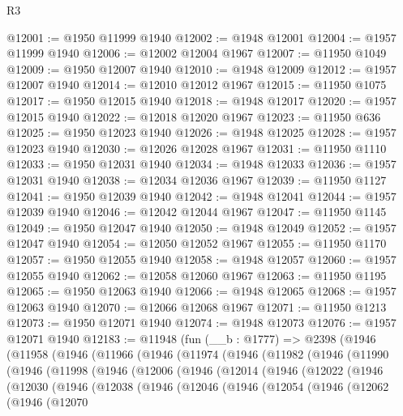 \begin{lexlean}{R3}
\begin{coremodule}
@12001 := @1950 @11999 @1940
@12002 := @1948 @12001
@12004 := @1957 @11999 @1940
@12006 := @12002 @12004 @1967
@12007 := @11950 @1049
@12009 := @1950 @12007 @1940
@12010 := @1948 @12009
@12012 := @1957 @12007 @1940
@12014 := @12010 @12012 @1967
@12015 := @11950 @1075
@12017 := @1950 @12015 @1940
@12018 := @1948 @12017
@12020 := @1957 @12015 @1940
@12022 := @12018 @12020 @1967
@12023 := @11950 @636
@12025 := @1950 @12023 @1940
@12026 := @1948 @12025
@12028 := @1957 @12023 @1940
@12030 := @12026 @12028 @1967
@12031 := @11950 @1110
@12033 := @1950 @12031 @1940
@12034 := @1948 @12033
@12036 := @1957 @12031 @1940
@12038 := @12034 @12036 @1967
@12039 := @11950 @1127
@12041 := @1950 @12039 @1940
@12042 := @1948 @12041
@12044 := @1957 @12039 @1940
@12046 := @12042 @12044 @1967
@12047 := @11950 @1145
@12049 := @1950 @12047 @1940
@12050 := @1948 @12049
@12052 := @1957 @12047 @1940
@12054 := @12050 @12052 @1967
@12055 := @11950 @1170
@12057 := @1950 @12055 @1940
@12058 := @1948 @12057
@12060 := @1957 @12055 @1940
@12062 := @12058 @12060 @1967
@12063 := @11950 @1195
@12065 := @1950 @12063 @1940
@12066 := @1948 @12065
@12068 := @1957 @12063 @1940
@12070 := @12066 @12068 @1967
@12071 := @11950 @1213
@12073 := @1950 @12071 @1940
@12074 := @1948 @12073
@12076 := @1957 @12071 @1940
@12183 := @11948
    (fun (__b : @1777) =>
    @2398
      (@1946
        (@11958
          (@1946
            (@11966
              (@1946
                (@11974
                  (@1946
                    (@11982
                      (@1946
                        (@11990
                          (@1946
                            (@11998
                              (@1946
                                (@12006
                                  (@1946
                                    (@12014
                                      (@1946
                                        (@12022
                                          (@1946
                                            (@12030
                                              (@1946
                                                (@12038
                                                  (@1946
                                                    (@12046
                                                      (@1946
                                                        (@12054
                                                          (@1946
                                                            (@12062
                                                              (@1946
                                                                (@12070

\end{coremodule}
\end{lexlean}
